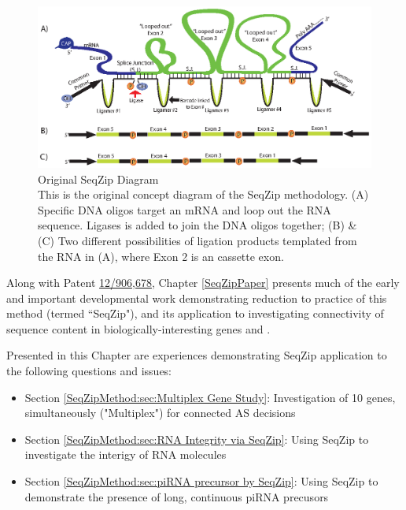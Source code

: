   \begin{figure} %
    \centering 
    \includegraphics{Figures/SeqZipMethod/OriginalSeqZipDiagram.eps}
    \caption[Original SeqZip Diagram]
    {
      Original SeqZip Diagram\\[0.25cm]
      This is the original concept diagram of the SeqZip methodology. (A) Specific DNA oligos target an mRNA and loop out the RNA sequence. Ligases is added to join the DNA oligos together; (B) \& (C) Two different possibilities of ligation products templated from the RNA in (A), where Exon 2 is an cassette exon.
    	}
    \label{SeqZipMethod:fig:Original SeqZip Diagram}
  	\end{figure}

  Along with Patent \href{http://1.usa.gov/PTG9BB}{12/906,678}, Chapter \ref{SeqZipPaper} presents much of the early and important developmental work demonstrating reduction to practice of this method (termed ``SeqZip"), and its application to investigating connectivity of sequence content in biologically-interesting genes \fn{} and \dscam{}. 

  Presented in this Chapter are experiences demonstrating SeqZip application to the following questions and issues:

  \begin{itemize} %
    \item Section \ref{SeqZipMethod:sec:Multiplex Gene Study}: Investigation of 10 genes, simultaneously ("Multiplex") for connected AS decisions
    \item Section \ref{SeqZipMethod:sec:RNA Integrity via SeqZip}: Using SeqZip to investigate the interigy of RNA molecules
    \item Section \ref{SeqZipMethod:sec:piRNA precursor by SeqZip}: Using SeqZip to demonstrate the presence of long, continuous piRNA precusors
	  \end{itemize}

